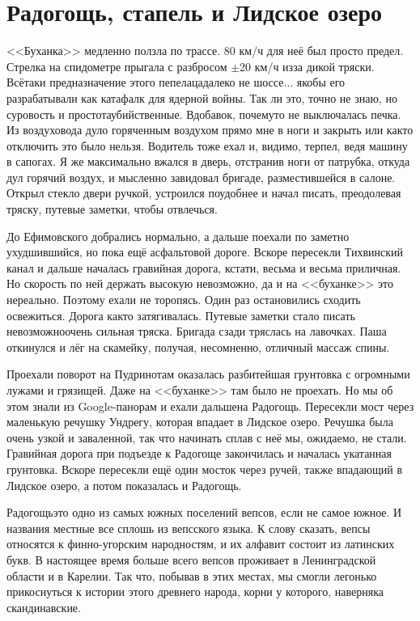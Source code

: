 \chapter{Радогощь, стапель и Лидское озеро} 
\vepsianrose

<<Буханка>> медленно ползла по трассе. 80 км/ч для неё был просто предел. Стрелка на спидометре прыгала с разбросом $\pm$20 км/ч из\sdash за дикой тряски. Всё\sdash таки предназначение этого пепелаца\mdash далеко не шоссе$\ldots$ якобы его разрабатывали как катафалк для ядерной войны. Так ли это, точно не знаю, но суровость и простота\mdash убийственные. Вдобавок, почему\sdash то не выключалась печка. Из воздуховода дуло горяченным воздухом прямо мне в ноги и закрыть или как\sdash то отключить это было нельзя. Водитель тоже ехал и, видимо, терпел, ведя машину в сапогах. Я же максимально вжался в дверь, отстранив ноги от патрубка, откуда дул горячий воздух, и мысленно завидовал бригаде, разместившейся в салоне. Открыл стекло двери ручкой, устроился поудобнее и начал писать, преодолевая тряску, путевые заметки, чтобы отвлечься. 

До Ефимовского добрались нормально, а дальше поехали по заметно ухудшившийся, но пока ещё асфальтовой дороге. Вскоре пересекли Тихвинский канал и дальше началась гравийная дорога, кстати, весьма и весьма приличная. Но скорость по ней держать высокую невозможно, да и на <<буханке>> это нереально. Поэтому ехали не торопясь. Один раз остановились сходить освежиться. Дорога как\sdash то затягивалась. Путевые заметки стало писать невозможно\mdash очень сильная тряска. Бригада сзади тряслась на лавочках. Паша откинулся и лёг на скамейку, получая, несомненно, отличный массаж спины.

Проехали поворот на Пудрино\mdash там оказалась разбитейшая грунтовка с огромными лужами и грязищей. Даже на <<буханке>> там было не проехать. Но мы об этом знали из Google-панорам и ехали дальше\mdash на Радогощь. Пересекли мост через маленькую речушку Ундрегу, которая впадает в Лидское озеро. Речушка была очень узкой и заваленной, так что начинать сплав с неё мы, ожидаемо, не стали. Гравийная дорога при подъезде к Радогоще закончилась и началась укатанная грунтовка. Вскоре пересекли ещё один мосток через ручей, также впадающий в Лидское озеро, а потом показалась и Радогощь. 

Радогощь\mdash это одно из самых южных поселений вепсов, если не самое южное. И названия местные все сплошь из вепсского языка. К слову сказать, вепсы относятся к финно-угорским народностям, и их алфавит состоит из латинских букв. В настоящее время больше всего вепсов проживает в Ленинградской области и в Карелии. Так что, побывав в этих местах, мы смогли легонько прикоснуться к истории этого древнего народа, корни у которого, наверняка скандинавские. 

